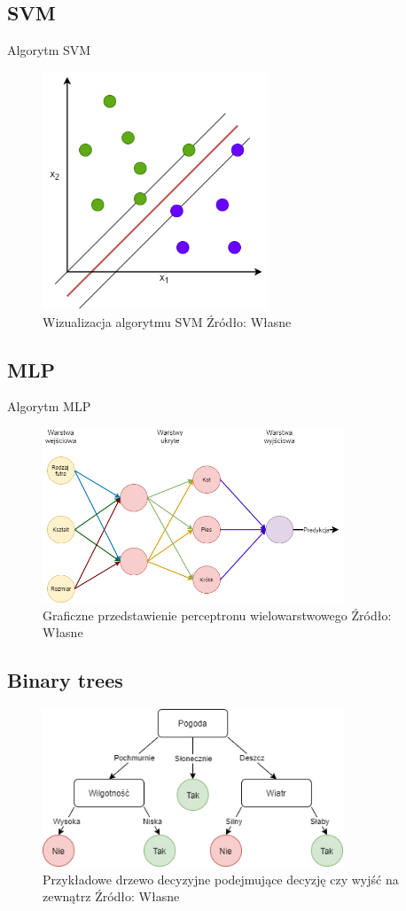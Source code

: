 \subsection{SVM}
Algorytm SVM
\begin{figure}[H]
    \centering
    \includegraphics[width=0.6\textwidth]{./Img/SVM.png}
    \caption{Wizualizacja algorytmu SVM Źródło: Własne}
\end{figure}
\subsection{MLP}
Algorytm MLP
\begin{figure}[H]
    \centering
    \includegraphics[width=0.8\textwidth]{./Img/MLP.png}
    \caption{Graficzne przedstawienie perceptronu wielowarstwowego Źródło: Własne}
\end{figure}
\subsection{Binary trees}
\begin{figure}[H]
    \centering
    \includegraphics[width=0.8\textwidth]{./Img/BinaryTree.png}
    \caption{Przykładowe drzewo decyzyjne podejmujące decyzję czy wyjść na zewnątrz Źródło: Własne}
\end{figure}
